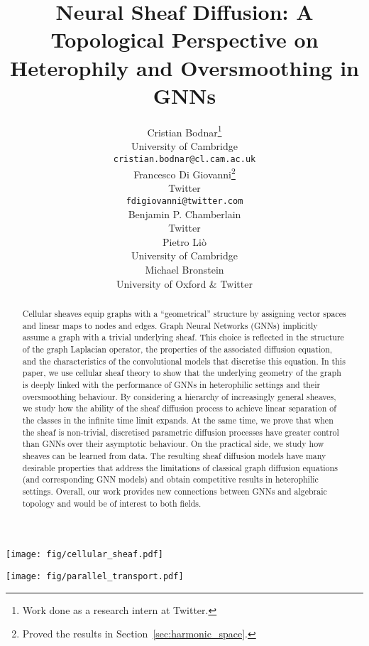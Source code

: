 \documentclass{article}
\title{Neural Sheaf Diffusion: 
A Topological Perspective on Heterophily and Oversmoothing in GNNs}
\author{Cristian Bodnar\thanks{Work done as a research intern at Twitter.} \\
University of Cambridge\\
\texttt{cristian.bodnar@cl.cam.ac.uk} \\
\And
Francesco Di Giovanni\thanks{Proved the results in Section~\ref{sec:harmonic_space}.} \\
Twitter \\
\texttt{fdigiovanni@twitter.com} \\
\AND
Benjamin P. Chamberlain \\
Twitter \\
\And
Pietro Li\`{o} \\
University of Cambridge \\
\And
Michael Bronstein \\
University of Oxford \& Twitter \\
}
\begin{document}
\maketitle


\begin{abstract}
Cellular sheaves equip graphs with a ``geometrical'' structure by assigning vector spaces and linear maps to nodes and edges. Graph Neural Networks (GNNs) implicitly assume a graph with a trivial underlying sheaf. This choice is reflected in the structure of the graph Laplacian operator, the properties of the associated diffusion equation, and the characteristics of the convolutional models that discretise this equation. In this paper, we use cellular sheaf theory to show that the underlying geometry of the graph is deeply linked with the performance of GNNs in heterophilic settings and their oversmoothing behaviour. By considering a hierarchy of increasingly general sheaves, we study how the ability of the sheaf diffusion process to achieve linear separation of the classes in the infinite time limit expands. At the same time, we prove that when the sheaf is non-trivial, discretised parametric diffusion processes have greater control than GNNs over their asymptotic behaviour. On the practical side, we study how sheaves can be learned from data. The resulting sheaf diffusion models have many desirable properties that address the limitations of classical graph diffusion equations (and corresponding GNN models) and obtain competitive results in heterophilic settings. Overall, our work provides new connections between GNNs and algebraic topology and would be of interest to both fields.
\end{abstract}

\let\thefootnote\relax{}
\begin{minipage}{0.5\textwidth}
\centering
    \texttt{[image: fig/cellular\_sheaf.pdf]}
    \label{fig:sheaf}
\end{minipage}
\hspace{11pt}
\begin{minipage}{0.44\textwidth}
\centering
    \texttt{[image: fig/parallel\_transport.pdf]}
    \label{fig:sheaf_transport}
\end{minipage}
\end{document}
